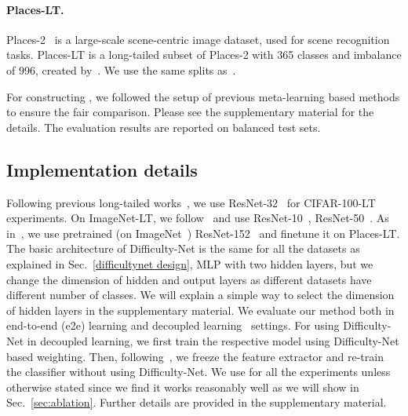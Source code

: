 \documentclass[10pt,twocolumn,letterpaper]{article}
\begin{document}
\paragraph{\bf Places-LT.} 
Places-2~\cite{places} is a large-scale scene-centric image dataset,
used for scene recognition tasks. Places-LT is a long-tailed subset of Places-2 with 365 classes and imbalance of 996, created by~\cite{oltr}. 
We use the same splits as~\cite{oltr}. 


For constructing , we followed the setup of previous meta-learning based methods \cite{jamal,meta-weight-net} to ensure the fair comparison. Please see the supplementary material for the details.
The evaluation results are reported on balanced test sets.

\subsection{Implementation details}
Following previous long-tailed works~\cite{classbalancedloss,oltr,eqlloss}, we use ResNet-32~\cite{ResNet} for  CIFAR-100-LT experiments. 
On ImageNet-LT, we follow~\cite{decoupling,oltr,mislas} and use ResNet-10~\cite{ResNet}, ResNet-50~\cite{ResNet}. 
As in~\cite{mislas}, we use pretrained (on ImageNet~\cite{imagenet}) ResNet-152~\cite{ResNet} and finetune it on Places-LT. 
The basic architecture of Difficulty-Net is the same for all the datasets as explained in Sec.~\ref{difficultynet design}, \ie MLP with two hidden layers, but we change the dimension of hidden and output layers as different datasets have different number of classes.
We will explain a simple way to select the dimension of hidden layers in the supplementary material. 
We evaluate our method both in end-to-end (e2e) learning and decoupled learning~\cite{decoupling} settings.
For using Difficulty-Net in decoupled learning, we first train the respective model using Difficulty-Net based weighting. 
Then, following~\cite{decoupling}, we freeze the feature extractor and re-train the classifier without using Difficulty-Net.
We use  for all the experiments unless otherwise stated since we find it works reasonably well as we will show in Sec.~\ref{sec:ablation}. Further details are provided in the supplementary material.
\end{document}
